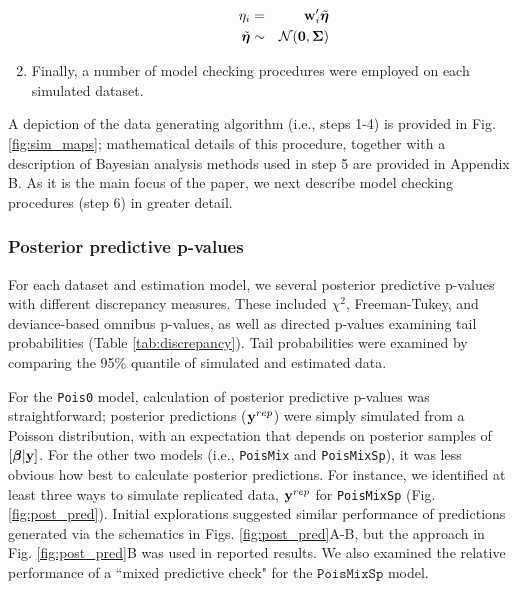 \documentclass[12pt,english]{article}
\begin{document}
\begin{spacing}{1.9}
\begin{enumerate}
\begin{itemize}
\begin{eqnarray*}
           \eta_i & = & {\bf w}_i^\prime \tilde{\boldsymbol{\eta}} \\
           \tilde{\boldsymbol{\eta}} & \sim & \mathcal{N}(\textbf{0},\boldsymbol{\Sigma}) \\
          \end{eqnarray*}
      \end{itemize}
  \item Finally, a number of model checking procedures were employed on each simulated dataset.
\end{enumerate}
A depiction of the data generating algorithm (i.e., steps 1-4) is provided in Fig. \ref{fig:sim_maps}; mathematical details of this procedure, together with a description of Bayesian analysis methods used in step 5 are provided in Appendix B.  As it is the main focus of the paper, we next describe model checking procedures (step 6) in greater detail.

\subsubsection{Posterior predictive p-values}

For each dataset and estimation model, we several posterior predictive p-values with different discrepancy measures.  These included $\chi^2$, Freeman-Tukey, and deviance-based omnibus p-values, as well as directed p-values examining tail probabilities (Table \ref{tab:discrepancy}). Tail probabilities were examined by comparing the 95\% quantile of simulated and estimated data.

For the \texttt{Pois0} model, calculation of posterior predictive p-values was straightforward; posterior predictions (${\bf y}^{rep}$) were simply simulated from a Poisson distribution, with an expectation that depends on posterior samples of $[\boldsymbol{\beta}|{\bf y}]$.  For the other two models (i.e., \texttt{PoisMix} and \texttt{PoisMixSp}), it was less obvious how best to calculate posterior predictions.  For instance, we identified at least three ways to simulate replicated data, ${\bf y}^{rep}$ for \texttt{PoisMixSp} (Fig. \ref{fig:post_pred}).  Initial explorations suggested similar performance of predictions generated via the schematics in Figs. \ref{fig:post_pred}A-B, but the approach in Fig. \ref{fig:post_pred}B was used in reported results.  We also examined the relative performance of a ``mixed predictive check" \citep[][; Fig. \ref{fig:post_pred}C]{MarshallSpiegelhalter2007} for the $\texttt{PoisMixSp}$ model.


\end{spacing}
\end{document}

